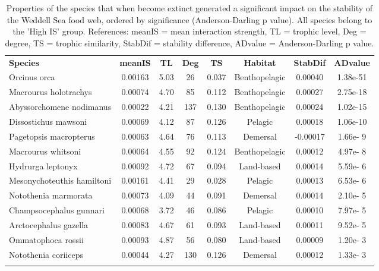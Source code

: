 \documentclass[gc, manuscript]{copernicus}
\begin{document}
\begin{table}[t]
\caption{Properties of the species that when become extinct generated a significant impact on the stability of the Weddell Sea food web, ordered by significance (Anderson-Darling p value). All species belong to the 'High IS' group.  References: meanIS = mean interaction strength, TL = trophic level, Deg = degree, TS = trophic similarity, StabDif = stability difference, ADvalue = Anderson-Darling p value.}
\begin{tabular}{l c c c c c c c}
\tophline

\textbf{Species} & \textbf{meanIS} & \textbf{TL} & \textbf{Deg} & \textbf{TS} & \textbf{Habitat} & \textbf{StabDif} & \textbf{ADvalue}\\
\middlehline
Orcinus orca & 0.00163 & 5.03 & 26 & 0.037 & Benthopelagic & 0.00040 & 1.38e-51 \\
\middlehline
Macrourus holotrachys & 0.00074 & 4.70 & 85 & 0.112 & Benthopelagic & 0.00027 & 2.75e-18 \\
\middlehline
Abyssorchomene nodimanus & 0.00022 & 4.21 & 137 & 0.130 & Benthopelagic & 0.00024 & 1.02e-15 \\
\middlehline
Dissostichus mawsoni & 0.00069 & 4.12 & 87 & 0.126 & Pelagic & 0.00018 & 1.06e-10 \\
\middlehline
Pagetopsis macropterus & 0.00063 & 4.64 & 76 & 0.113 & Demersal & -0.00017 & 1.66e- 9 \\
\middlehline
Macrourus whitsoni & 0.00064 & 4.55 & 92 & 0.124 & Benthopelagic & 0.00012 & 4.97e- 8 \\
\middlehline
Hydrurga leptonyx & 0.00092 & 4.72 & 67 & 0.094 & Land-based & 0.00014 & 5.59e- 6 \\
\middlehline
Mesonychoteuthis hamiltoni & 0.00161 & 4.41 & 29 & 0.028 & Pelagic & 0.00013 & 6.53e- 6 \\
\middlehline
Notothenia marmorata & 0.00073 & 4.09 & 44 & 0.091 & Demersal & 0.00014 & 2.10e- 5 \\
\middlehline
Champsocephalus gunnari & 0.00068 & 3.72 & 46 & 0.086 & Pelagic & 0.00010 & 7.97e- 5 \\
\middlehline
Arctocephalus gazella & 0.00083 & 4.67 & 61 & 0.093 & Land-based & 0.00011 & 9.52e- 5 \\
\middlehline
Ommatophoca rossii & 0.00093 & 4.87 & 56 & 0.080 & Land-based & 0.00009 & 1.20e- 3 \\
\middlehline
Notothenia coriiceps & 0.00044 & 4.27 & 130 & 0.126 & Demersal & 0.00012 & 1.33e- 3 \\

\bottomhline
\end{tabular}
\end{table}
\end{document}
